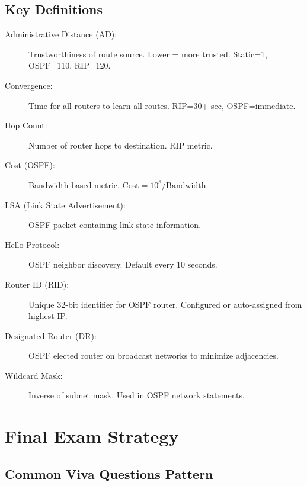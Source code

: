 \documentclass[12pt,a4paper]{article}
\begin{document}
\subsection{Key Definitions}

\begin{description}
    \item[Administrative Distance (AD):] Trustworthiness of route source. Lower = more trusted. Static=1, OSPF=110, RIP=120.
    
    \item[Convergence:] Time for all routers to learn all routes. RIP=30+ sec, OSPF=immediate.
    
    \item[Hop Count:] Number of router hops to destination. RIP metric.
    
    \item[Cost (OSPF):] Bandwidth-based metric. $\text{Cost} = 10^8 / \text{Bandwidth}$.
    
    \item[LSA (Link State Advertisement):] OSPF packet containing link state information.
    
    \item[Hello Protocol:] OSPF neighbor discovery. Default every 10 seconds.
    
    \item[Router ID (RID):] Unique 32-bit identifier for OSPF router. Configured or auto-assigned from highest IP.
    
    \item[Designated Router (DR):] OSPF elected router on broadcast networks to minimize adjacencies.
    
    \item[Wildcard Mask:] Inverse of subnet mask. Used in OSPF network statements.
\end{description}

\section{Final Exam Strategy}

\subsection{Common Viva Questions Pattern}
\end{document}
